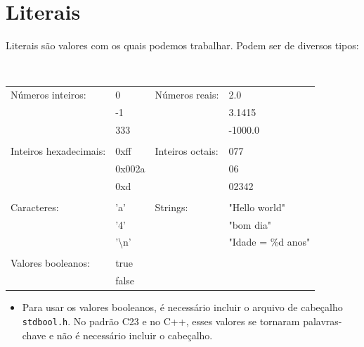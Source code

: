 \section{Literais}
\label{sec:lit}

Literais são valores com os quais podemos trabalhar. Podem ser de diversos tipos:

\nobreakspace

{\tt
\begin{tabular}{llll}
Números inteiros:        & 0                     & Números reais:    & 2.0       \\
                         & -1                    &                   & 3.1415    \\
                         & 333                   &                   & -1000.0   \\
\\
Inteiros hexadecimais:   & 0xff                  & Inteiros octais:  & 077       \\
                         & 0x002a                &                   & 06        \\
                         & 0xd                   &                   & 02342     \\
\\
Caracteres:              & 'a'                   & Strings:          & "Hello world"       \\
                         & '4'                   &                   & "bom dia"           \\
                         & '\textbackslash n'    &                   & "Idade = \%d anos"   \\
\\
Valores booleanos:       & true                  &                   &                      \\
                         & false                 &                   &                      \\
\end{tabular}
}

\begin{itemize}

\item Para usar os valores booleanos, é necessário incluir o arquivo de cabeçalho {\tt stdbool.h}. No padrão C23 e no C++, esses valores se tornaram palavras-chave e não é necessário incluir o cabeçalho.

\end{itemize}


